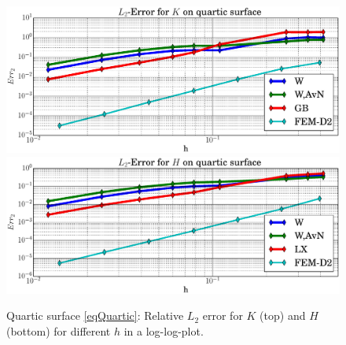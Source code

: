   \begin{figure}
    \centering\includegraphics[width=.49\textwidth]{bilder/quartic/L2K.eps}
    \centering\includegraphics[width=.49\textwidth]{bilder/quartic/L2H.eps}
    \caption{Quartic surface \eqref{eqQuartic}: Relative \( L_{2} \) error for \( K \) (top) and
                                                     \( H \) (bottom) for different \( h \) in a log-log-plot.}
    \label{figQuarticL2Err}
  \end{figure}

